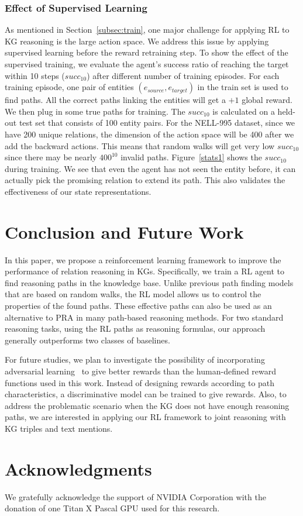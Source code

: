 \documentclass[11pt,letterpaper]{article}
\begin{document}
\subsubsection{Effect of Supervised Learning}
As mentioned in Section~\ref{subsec:train}, one major challenge for applying RL to KG reasoning is the large action space. We address this issue by applying supervised learning before the reward retraining step. To show the effect of the supervised training, we evaluate the agent's success ratio of reaching the target within 10 steps ($succ_{10}$) after different number of training episodes. For each training episode, one pair of entities $(e_{source},e_{target})$ in the train set is used to find paths. All the correct paths linking the entities will get a $+1$ global reward. We then plug in some true paths for training. The $succ_{10}$ is calculated on a held-out test set that consists of 100 entity pairs. For the NELL-995 dataset, since we have 200 unique relations, the dimension of the action space will be 400 after we add the backward actions. This means that random walks will get very low $succ_{10}$ since there may be nearly $400^{10}$ invalid paths. Figure~\ref{stats1} shows the $succ_{10}$ during training. We see that even the agent has not seen the entity before, it can actually pick the promising relation to extend its path. This also validates the effectiveness of our state representations.

\section{Conclusion and Future Work}
\label{sec:conclude}
In this paper, we propose a reinforcement learning framework to improve the performance of relation reasoning in KGs. Specifically, we train a RL agent to find reasoning paths in the knowledge base. Unlike previous path finding models that are based on random walks, the RL model allows us to control the properties of the found paths. These effective paths can also be used as an alternative to PRA in many path-based reasoning methods. For two standard reasoning tasks, using the RL paths as reasoning formulas, our approach generally outperforms two classes of baselines. 

For future studies, we plan to investigate the possibility of incorporating adversarial learning~\cite{goodfellow2014generative} to give better rewards than the human-defined reward functions used in this work. Instead of designing rewards according to path characteristics, a discriminative model can be trained to give rewards. Also, to address the problematic scenario when the KG does not have enough reasoning paths, we are interested in applying our RL framework to joint reasoning with KG triples and text mentions.

\section*{Acknowledgments}
We gratefully acknowledge the support of NVIDIA Corporation with the donation of one Titan X Pascal GPU used for this research.




\end{document}
